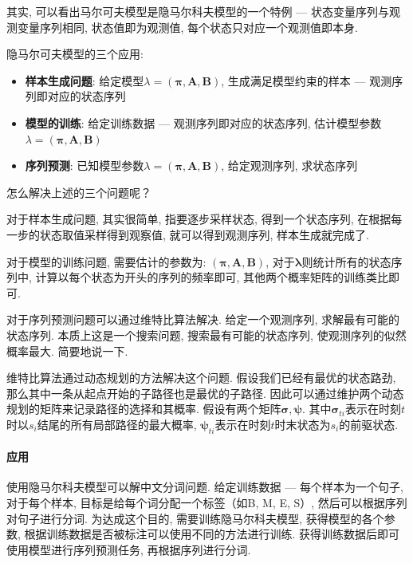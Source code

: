 其实, 可以看出马尔可夫模型是隐马尔科夫模型的一个特例 --- 状态变量序列与观测变量序列相同, 状态值即为观测值, 每个状态只对应一个观测值即本身. 

隐马尔可夫模型的三个应用: 
\begin{itemize}
	\item \textbf{样本生成问题}: 给定模型$\lambda = (\boldsymbol{\pi}, \boldsymbol{A}, \boldsymbol{B})$, 生成满足模型约束的样本 --- 观测序列即对应的状态序列
	\item \textbf{模型的训练}: 给定训练数据 --- 观测序列即对应的状态序列, 估计模型参数$\lambda = (\boldsymbol{\pi}, \boldsymbol{A}, \boldsymbol{B})$
	\item \textbf{序列预测}: 已知模型参数$\lambda = (\boldsymbol{\pi}, \boldsymbol{A}, \boldsymbol{B})$, 给定观测序列, 求状态序列
\end{itemize}

怎么解决上述的三个问题呢？

对于样本生成问题, 其实很简单, 指要逐步采样状态, 得到一个状态序列, 在根据每一步的状态取值采样得到观察值, 就可以得到观测序列, 样本生成就完成了. 

对于模型的训练问题, 需要估计的参数为: $(\boldsymbol{\pi}, \boldsymbol{A}, \boldsymbol{B})$, 对于$\boldsymbol{\lambda}$则统计所有的状态序列中, 计算以每个状态为开头的序列的频率即可, 其他两个概率矩阵的训练类比即可. 

对于序列预测问题可以通过维特比算法解决. 给定一个观测序列, 求解最有可能的状态序列. 本质上这是一个搜索问题, 搜索最有可能的状态序列, 使观测序列的似然概率最大. 简要地说一下. 

维特比算法通过动态规划的方法解决这个问题. 假设我们已经有最优的状态路劲, 那么其中一条从起点开始的子路径也是最优的子路径. 因此可以通过维护两个动态规划的矩阵来记录路径的选择和其概率. 假设有两个矩阵$\boldsymbol{\sigma}, \boldsymbol{\psi}$. 其中$\boldsymbol{\sigma}_{ti}$表示在时刻$t$时以$s_i$结尾的所有局部路径的最大概率, $\boldsymbol{\psi}_{ti}$表示在时刻$t$时末状态为$s_i$的前驱状态. 

\paragraph{应用}使用隐马尔科夫模型可以解中文分词问题. 给定训练数据 --- 每个样本为一个句子, 对于每个样本, 目标是给每个词分配一个标签（如{B, M, E, S}）, 然后可以根据序列对句子进行分词. 为达成这个目的, 需要训练隐马尔科夫模型, 获得模型的各个参数, 根据训练数据是否被标注可以使用不同的方法进行训练. 获得训练数据后即可使用模型进行序列预测任务, 再根据序列进行分词. 


